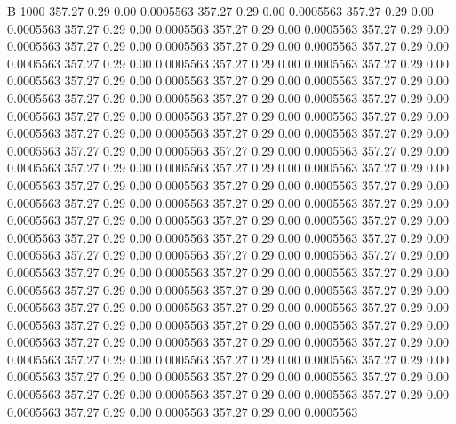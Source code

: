 


B 1000
 357.27    0.29    0.00   0.0005563
 357.27    0.29    0.00   0.0005563
 357.27    0.29    0.00   0.0005563
 357.27    0.29    0.00   0.0005563
 357.27    0.29    0.00   0.0005563
 357.27    0.29    0.00   0.0005563
 357.27    0.29    0.00   0.0005563
 357.27    0.29    0.00   0.0005563
 357.27    0.29    0.00   0.0005563
 357.27    0.29    0.00   0.0005563
 357.27    0.29    0.00   0.0005563
 357.27    0.29    0.00   0.0005563
 357.27    0.29    0.00   0.0005563
 357.27    0.29    0.00   0.0005563
 357.27    0.29    0.00   0.0005563
 357.27    0.29    0.00   0.0005563
 357.27    0.29    0.00   0.0005563
 357.27    0.29    0.00   0.0005563
 357.27    0.29    0.00   0.0005563
 357.27    0.29    0.00   0.0005563
 357.27    0.29    0.00   0.0005563
 357.27    0.29    0.00   0.0005563
 357.27    0.29    0.00   0.0005563
 357.27    0.29    0.00   0.0005563
 357.27    0.29    0.00   0.0005563
 357.27    0.29    0.00   0.0005563
 357.27    0.29    0.00   0.0005563
 357.27    0.29    0.00   0.0005563
 357.27    0.29    0.00   0.0005563
 357.27    0.29    0.00   0.0005563
 357.27    0.29    0.00   0.0005563
 357.27    0.29    0.00   0.0005563
 357.27    0.29    0.00   0.0005563
 357.27    0.29    0.00   0.0005563
 357.27    0.29    0.00   0.0005563
 357.27    0.29    0.00   0.0005563
 357.27    0.29    0.00   0.0005563
 357.27    0.29    0.00   0.0005563
 357.27    0.29    0.00   0.0005563
 357.27    0.29    0.00   0.0005563
 357.27    0.29    0.00   0.0005563
 357.27    0.29    0.00   0.0005563
 357.27    0.29    0.00   0.0005563
 357.27    0.29    0.00   0.0005563
 357.27    0.29    0.00   0.0005563
 357.27    0.29    0.00   0.0005563
 357.27    0.29    0.00   0.0005563
 357.27    0.29    0.00   0.0005563
 357.27    0.29    0.00   0.0005563
 357.27    0.29    0.00   0.0005563
 357.27    0.29    0.00   0.0005563
 357.27    0.29    0.00   0.0005563
 357.27    0.29    0.00   0.0005563
 357.27    0.29    0.00   0.0005563
 357.27    0.29    0.00   0.0005563
 357.27    0.29    0.00   0.0005563
 357.27    0.29    0.00   0.0005563
 357.27    0.29    0.00   0.0005563
 357.27    0.29    0.00   0.0005563
 357.27    0.29    0.00   0.0005563
 357.27    0.29    0.00   0.0005563
 357.27    0.29    0.00   0.0005563
 357.27    0.29    0.00   0.0005563
 357.27    0.29    0.00   0.0005563
 357.27    0.29    0.00   0.0005563
 357.27    0.29    0.00   0.0005563
 357.27    0.29    0.00   0.0005563
 357.27    0.29    0.00   0.0005563
 357.27    0.29    0.00   0.0005563
 357.27    0.29    0.00   0.0005563
 357.27    0.29    0.00   0.0005563
